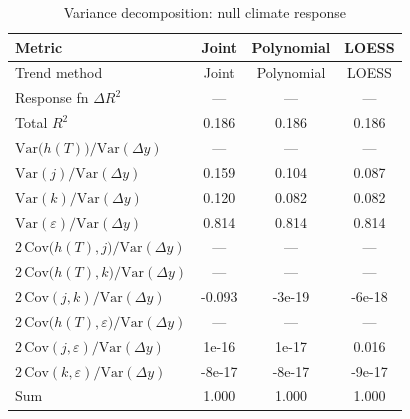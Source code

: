 \begin{table}[htbp]
\centering
\caption{Variance decomposition: null climate response}
\label{tab:variance_decomp_null}

\small
\begin{tabular}{@{}lccc@{}}
\toprule
Metric & Joint & Polynomial & LOESS \\
\midrule
Trend method & Joint & Polynomial & LOESS \\
\midrule
Response fn $\Delta R^2$ & — & — & — \\
Total $R^2$ & 0.186 & 0.186 & 0.186 \\
\midrule
$\mathrm{Var}\!\big(h(T)\big)/\mathrm{Var}(\Delta y)$ & — & — & — \\
$\mathrm{Var}(j)/\mathrm{Var}(\Delta y)$ & 0.159 & 0.104 & 0.087 \\
$\mathrm{Var}(k)/\mathrm{Var}(\Delta y)$ & 0.120 & 0.082 & 0.082 \\
$\mathrm{Var}(\varepsilon)/\mathrm{Var}(\Delta y)$ & 0.814 & 0.814 & 0.814 \\
\midrule
$2\,\mathrm{Cov}\!\big(h(T),j\big)/\mathrm{Var}(\Delta y)$ & — & — & — \\
$2\,\mathrm{Cov}\!\big(h(T),k\big)/\mathrm{Var}(\Delta y)$ & — & — & — \\
$2\,\mathrm{Cov}(j,k)/\mathrm{Var}(\Delta y)$ & -0.093 & -3e-19 & -6e-18 \\
$2\,\mathrm{Cov}\!\big(h(T),\varepsilon\big)/\mathrm{Var}(\Delta y)$ & — & — & — \\
$2\,\mathrm{Cov}(j,\varepsilon)/\mathrm{Var}(\Delta y)$ & 1e-16 & 1e-17 & 0.016 \\
$2\,\mathrm{Cov}(k,\varepsilon)/\mathrm{Var}(\Delta y)$ & -8e-17 & -8e-17 & -9e-17 \\
\midrule
Sum & 1.000 & 1.000 & 1.000 \\
\bottomrule
\end{tabular}
\end{table}